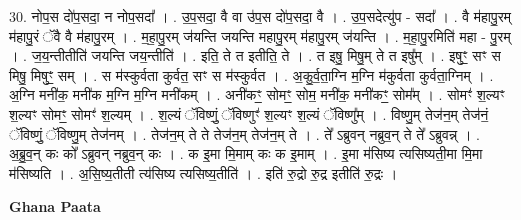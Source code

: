 \documentclass[17pt]{extarticle}
\begin{document}
30. नोप॒स दो॑प॒सदा॒ न नोप॒सदा᳚ । . उ॒प॒सदा॒ वै वा उ॑प॒स दो॑प॒सदा॒ वै । . उ॒प॒सदेत्यु॑प - सदा᳚ । . वै म॑हापु॒रम् म॑हापु॒रं ॅवै वै म॑हापु॒रम् । . म॒हा॒पु॒रम् ज॑यन्ति जयन्ति महापु॒रम् म॑हापु॒रम् ज॑यन्ति । . म॒हा॒पु॒रमिति॑ महा - पु॒रम् । . ज॒य॒न्तीतीति॑ जयन्ति जय॒न्तीति॑ । . इति॒ ते त इतीति॒ ते । . त इषु॒ मिषु॒म् ते त इषु᳚म् । . इषुꣳ॒॒ सꣳ स मिषु॒ मिषुꣳ॒॒ सम् । . स म॑स्कुर्वता कुर्वत॒ सꣳ स म॑स्कुर्वत । . अ॒कु॒र्व॒ता॒ग्नि म॒ग्नि म॑कुर्वता कुर्वता॒ग्निम् । . अ॒ग्नि मनी॑क॒ मनी॑क म॒ग्नि म॒ग्नि मनी॑कम् । . अनी॑कꣳ॒॒ सोमꣳ॒॒ सोम॒ मनी॑क॒ मनी॑कꣳ॒॒ सोम᳚म् । . सोमꣳ॑ श॒ल्यꣳ श॒ल्यꣳ सोमꣳ॒॒ सोमꣳ॑ श॒ल्यम् । . श॒ल्यं ॅविष्णुं॒ ॅविष्णुꣳ॑ श॒ल्यꣳ श॒ल्यं ॅविष्णु᳚म् । . विष्णु॒म् तेज॑न॒म् तेज॑नं॒ ॅविष्णुं॒ ॅविष्णु॒म् तेज॑नम् । . तेज॑न॒म् ते ते तेज॑न॒म् तेज॑न॒म् ते । . ते᳚ ऽब्रुवन् नब्रुव॒न् ते ते᳚ ऽब्रुवन्न् । . अ॒ब्रु॒व॒न् कः को᳚ ऽब्रुवन् नब्रुव॒न् कः । . क इ॒मा मि॒माम् कः क इ॒माम् । . इ॒मा म॑सिष्य त्यसिष्यती॒मा मि॒मा म॑सिष्यति । . अ॒सि॒ष्य॒तीती त्य॑सिष्य त्यसिष्य॒तीति॑ । . इति॑ रु॒द्रो रु॒द्र इतीति॑ रु॒द्रः । \newline

\textbf{Ghana Paata } \newline
\end{document}
